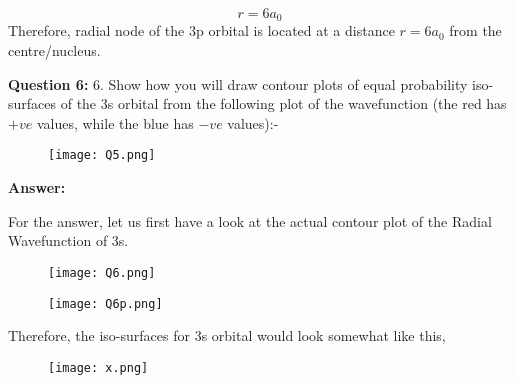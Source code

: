 \documentclass[11pt]{article}
\begin{document}
$$r=6a_{0}$$
Therefore, radial node of the 3p orbital is located at a distance $r=6a_{0}$ from the centre/nucleus.\\
\pagebreak

\textbf{Question 6: }6. Show how you will draw contour plots of equal probability iso-surfaces of the 3s orbital from the following plot of the wavefunction (the red has $+ve$ values, while the blue has $-ve$ values):-

	\begin{figure}[H]
	\centering
	\texttt{[image: Q5.png]}
	\end{figure}

\textbf{Answer: }

For the answer, let us first have a look at the actual contour plot of the Radial Wavefunction of 3s.

	\begin{figure}[H]
	\centering
	\texttt{[image: Q6.png]}
\end{figure}

	\begin{figure}[H]
	\centering
	\texttt{[image: Q6p.png]}
\end{figure}

Therefore, the iso-surfaces for 3s orbital would look somewhat like this,


	\begin{figure}[H]
	\centering
	\texttt{[image: x.png]}
\end{figure}
\end{document}
